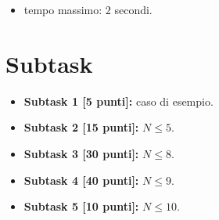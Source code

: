 \documentclass[a4paper,11pt]{article}
\begin{document}
\begin{itemize}
\item tempo massimo: $2$ secondi.
\end{itemize}

\section*{Subtask}
\begin{itemize}
\item \textbf{Subtask 1 [5 punti]:} caso di esempio.
\item \textbf{Subtask 2 [15 punti]:} $N \le 5$.
\item \textbf{Subtask 3 [30 punti]:} $N \le 8$.
\item \textbf{Subtask 4 [40 punti]:} $N \le 9$.
\item \textbf{Subtask 5 [10 punti]:} $N \le 10$.
\end{itemize}

\end{document}
